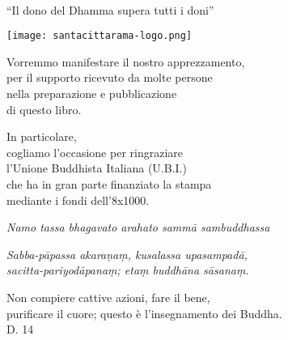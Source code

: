 \cleartorecto
\thispagestyle{empty}

\mbox{}\vfill

{\centering

{\spectralScFont {}}\\
``Il dono del Dhamma supera tutti i doni''

\vspace*{2\baselineskip}

\texttt{[image: santacittarama-logo.png]}

\vspace*{4\baselineskip}

{\itshape

  Vorremmo manifestare il nostro apprezzamento,\\
  per il supporto ricevuto da molte persone\\
  nella preparazione e pubblicazione\\
  di questo libro.

  \vspace*{2\baselineskip}

  In particolare,\\
  cogliamo l’occasione per ringraziare\\
  l’Unione Buddhista Italiana (U.B.I.)\\
  che ha in gran parte finanziato la stampa\\
  mediante i fondi dell’8x1000.

}

}

\vfill\mbox{}

\clearpage
\thispagestyle{empty}

\mbox{}\vfill

{\centering

\emph{Namo tassa bhagavato arahato sammā sambuddhassa}

\vspace*{8\baselineskip}

\emph{Sabba-pāpassa akaraṇaṃ, kusalassa upasampadā,\\
sacitta-pariyodāpanaṃ; etaṃ buddhāna sāsanaṃ.}

\vspace*{2\baselineskip}

Non compiere cattive azioni, fare il bene,\\
purificare il cuore; questo è l’insegnamento dei Buddha.\\
D. 14

}

\vfill\mbox{}